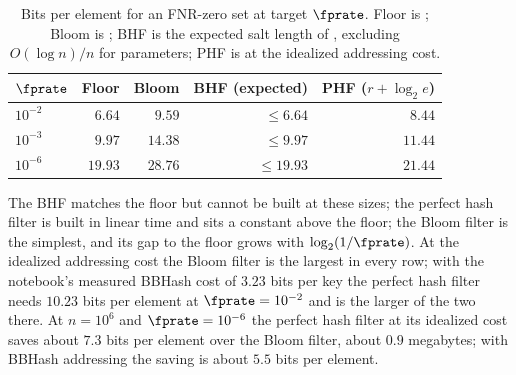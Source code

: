 \begin{table}[h]
\centering
\small
\caption{Bits per element for an FNR-zero set at target $\fprate$.
Floor is ; Bloom is ;
BHF is the expected salt length of , excluding
$O(\log n)/n$ for parameters; PHF is  at the
idealized addressing cost.}
\label{tab:bhf-comparison}
\begin{tabular}{l|rrrr}
\hline
  $\fprate$  & Floor   & Bloom   & BHF (expected) & PHF ($r + \log_2 e$) \\
\hline
  $10^{-2}$  & $6.64$  & $9.59$  & $\le 6.64$     & $8.44$  \\
  $10^{-3}$  & $9.97$  & $14.38$ & $\le 9.97$     & $11.44$ \\
  $10^{-6}$  & $19.93$ & $28.76$ & $\le 19.93$    & $21.44$ \\
\hline
\end{tabular}
\end{table}

The BHF matches the floor but cannot be built at these sizes; the
perfect hash filter is built in linear time and sits a constant above
the floor; the Bloom filter is the simplest, and its gap to the floor
grows with $\log_2(1/\fprate)$. At the idealized addressing cost the
Bloom filter is the largest in every row; with the notebook's measured
BBHash cost of $3.23$ bits per key the perfect hash filter needs $10.23$
bits per element at $\fprate = 10^{-2}$ and is the larger of the two
there. At $n =
10^6$ and $\fprate = 10^{-6}$ the perfect hash filter at its idealized
cost saves about $7.3$ bits per element over the Bloom filter, about
$0.9$ megabytes; with BBHash addressing the saving is about $5.5$ bits
per element.
